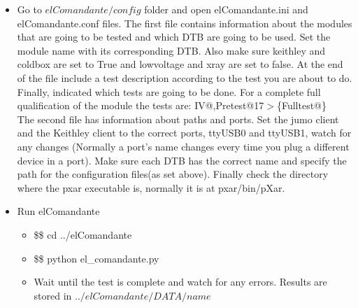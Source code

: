 \documentclass[12pt]{unlsilabsop}
\makeatletter
\newcommand{\at}{\makeatletter @\makeatother}
\makeatother
\begin{document}
\begin{enumerate}
\begin{itemize}
		\item Go to $elComandante/config$ folder and open elComandante.ini and elComandante.conf files. The first file contains information about the modules that are going to be tested and which DTB are going to be used. Set the module name with its corresponding DTB. Also make sure keithley and coldbox are set to True and lowvoltage and xray are set to false. At the end of the file include a test description according to the test you are about to do. Finally, indicated which tests are going to be done. For a complete full qualification of the module the tests are: IV\at 17,Pretest{\at}17$>$\{Fulltest\at 17\}\\
		The second file has information about paths and ports. Set the jumo client and the Keithley client to the correct ports, ttyUSB0 and ttyUSB1, watch for any changes (Normally a port's name changes every time you plug a different device in a port). Make sure each DTB has the correct name and specify the path for the configuration files(as set above). Finally check the directory where the pxar executable is, normally it is at pxar/bin/pXar.
		\item Run elComandante
		\begin{itemize}
			\item \$\$ cd ../elComandante
			\item \$\$ python el\_comandante.py
			\item Wait until the test is complete and watch for any errors. Results are stored in $../elComandante/DATA/name$
		\end{itemize}
	\end{itemize}
   

\end{enumerate}
\end{document}

